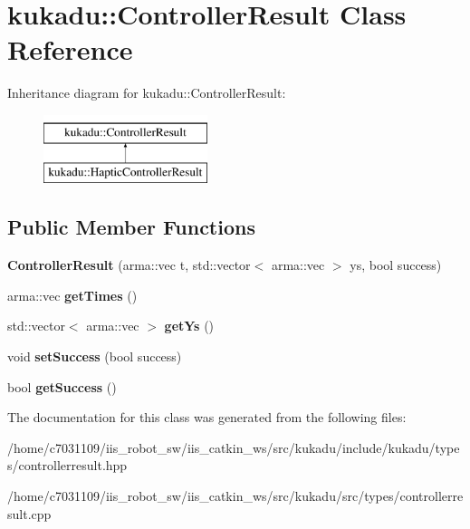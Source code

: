 \hypertarget{classkukadu_1_1ControllerResult}{\section{kukadu\-:\-:Controller\-Result Class Reference}
\label{classkukadu_1_1ControllerResult}
}
Inheritance diagram for kukadu\-:\-:Controller\-Result\-:\begin{figure}[H]
\begin{center}
\leavevmode
\includegraphics[height=2.000000cm]{classkukadu_1_1ControllerResult}
\end{center}
\end{figure}
\subsection*{Public Member Functions}
\begin{DoxyCompactItemize}
\item 
\hypertarget{classkukadu_1_1ControllerResult_ad2ed8a808d635b2b6f3183ae9447bd0c}{{\bfseries Controller\-Result} (arma\-::vec t, std\-::vector$<$ arma\-::vec $>$ ys, bool success)}\label{classkukadu_1_1ControllerResult_ad2ed8a808d635b2b6f3183ae9447bd0c}

\item 
\hypertarget{classkukadu_1_1ControllerResult_a26edcc9c10dccd4c53c18e081712ed48}{arma\-::vec {\bfseries get\-Times} ()}\label{classkukadu_1_1ControllerResult_a26edcc9c10dccd4c53c18e081712ed48}

\item 
\hypertarget{classkukadu_1_1ControllerResult_a6d39870fa7743699c4376562f687a56b}{std\-::vector$<$ arma\-::vec $>$ {\bfseries get\-Ys} ()}\label{classkukadu_1_1ControllerResult_a6d39870fa7743699c4376562f687a56b}

\item 
\hypertarget{classkukadu_1_1ControllerResult_a77c5a596b26000f06ee1138ce62c82a7}{void {\bfseries set\-Success} (bool success)}\label{classkukadu_1_1ControllerResult_a77c5a596b26000f06ee1138ce62c82a7}

\item 
\hypertarget{classkukadu_1_1ControllerResult_aeb935f4206986fea6d5762e4c31298b6}{bool {\bfseries get\-Success} ()}\label{classkukadu_1_1ControllerResult_aeb935f4206986fea6d5762e4c31298b6}

\end{DoxyCompactItemize}


The documentation for this class was generated from the following files\-:\begin{DoxyCompactItemize}
\item 
/home/c7031109/iis\-\_\-robot\-\_\-sw/iis\-\_\-catkin\-\_\-ws/src/kukadu/include/kukadu/types/controllerresult.\-hpp\item 
/home/c7031109/iis\-\_\-robot\-\_\-sw/iis\-\_\-catkin\-\_\-ws/src/kukadu/src/types/controllerresult.\-cpp\end{DoxyCompactItemize}

